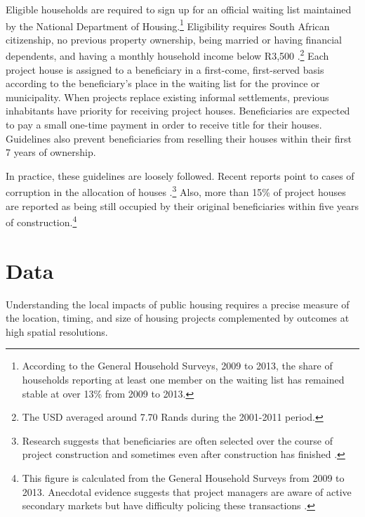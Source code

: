 \documentclass[12pt]{article}
\begin{document}
Eligible households are required to sign up for an official waiting list maintained by the National Department of Housing.\footnote{According to the General Household Surveys, 2009 to 2013, the share of households reporting at least one member on the waiting list has remained stable at over 13\% from 2009 to 2013.}  Eligibility requires South African citizenship, no previous property ownership, being married or having financial dependents, and having a monthly household income below R3,500 \citep{seriq}.\footnote{The USD averaged around 7.70 Rands during the 2001-2011 period.}  Each project house is assigned to a beneficiary in a first-come, first-served basis according to the beneficiary's place in the waiting list for the province or municipality. When projects replace existing informal settlements, previous inhabitants have priority for receiving project houses.  Beneficiaries are expected to pay a small one-time payment in order to receive title for their houses.  Guidelines also prevent beneficiaries from reselling their houses within their first 7 years of ownership.   %

In practice, these guidelines are loosely followed.  Recent reports point to cases of corruption in the allocation of houses \citep{seriq}.\footnote{Research suggests that beneficiaries are often selected over the course of project construction and sometimes even after construction has finished \citep{seriq}.}  Also, more than 15\% of project houses are reported as being still occupied by their original beneficiaries within five years of construction.\footnote{This figure is calculated from the General Household Surveys from 2009 to 2013. Anecdotal evidence suggests that project managers are aware of active secondary markets but have difficulty policing these transactions \citep{resale}.} 




\section{Data}\label{section:data}

Understanding the local impacts of public housing requires a precise measure of the location, timing, and size of housing projects complemented by outcomes at high spatial resolutions.
\end{document}
